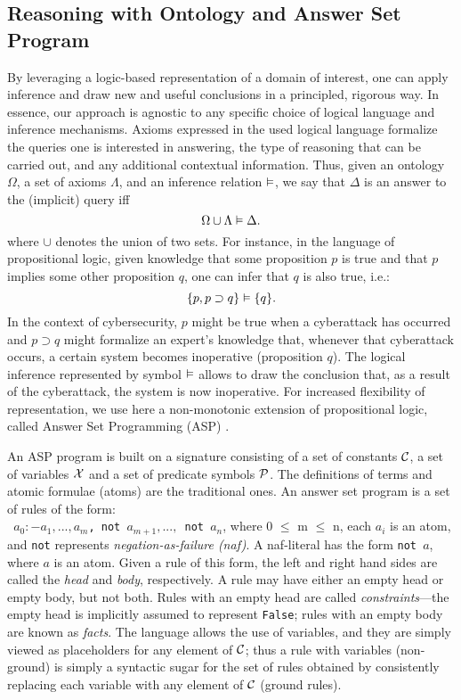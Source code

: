 \subsection{Reasoning with Ontology and Answer Set Program}
\label{sub-section:asp_reasoning_ontology}
By leveraging a logic-based representation of a domain of interest, one can apply inference and draw new and useful conclusions in a principled, rigorous way. In essence,  our approach is agnostic to any specific choice of logical language and inference mechanisms. Axioms expressed in the used logical language formalize the queries one is interested in answering, the type of reasoning that can be carried out, and any additional contextual information.
Thus, given an ontology $\Omega$, a set of axioms $\Lambda$, and an inference relation $\vDash$, we say that $\Delta$ is an answer to the (implicit) query iff
%
\[
\Omega \cup \Lambda \vDash \Delta.
\]
where $\cup$ denotes the union of two sets. For instance, in the language of propositional logic, given knowledge that some proposition $p$ is true and that $p$ implies some other proposition $q$, one can infer that $q$ is also true, i.e.:
\[
\{p, p \supset q\} \vDash \{q\}.
\]
In the context of cybersecurity, $p$ might be true when a cyberattack has occurred and $p \supset q$ might formalize an expert's knowledge that, whenever that cyberattack occurs, a certain system becomes inoperative (proposition $q$). The logical inference represented by symbol $\vDash$ allows to draw the conclusion that, as a result of the cyberattack, the system is now inoperative. For increased flexibility of representation, we use here a non-monotonic extension of propositional logic, called Answer Set Programming (ASP)  \cite{SonP06b,SonBTM05}.

An ASP program is built on a signature consisting of a set of constants $\cal C$,
a set of variables $\cal X$ and a set of predicate symbols $\cal P$. The definitions
of terms and atomic formulae (atoms) are the traditional ones. An answer set program is a set of rules of the form: \\
\texttt{ $a_0 {:-} a_1, . . . , a_m$, not $ a_{m+1}, . . . ,$ not  $a_n$}, where 0 $\leq$ m $\leq$ n, each $a_i$ is an atom, and \texttt{not} represents \textit{negation-as-failure (naf)}. A naf-literal has the form \texttt{not $a$}, where $a$ is an atom. Given a rule of this form, the left and right hand sides are called the \textit{head} and \textit{body}, respectively. A rule may have either an empty head or empty body, but not both. Rules with an empty head are called \textit{constraints}---the empty head is implicitly assumed to represent \texttt{False}; rules with an empty body are known as \textit{facts}. The language allows the use of variables, and they are simply viewed as placeholders for any element of $\cal C$; thus a rule with variables (non-ground) is simply a syntactic sugar for the set of rules obtained by consistently replacing each variable with any element of $\cal C$ (ground rules).

